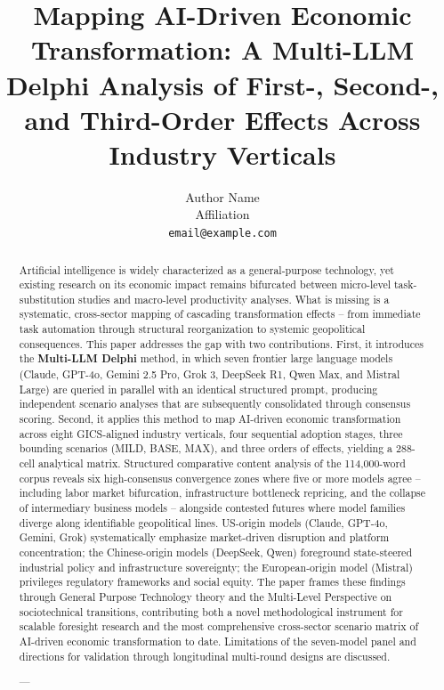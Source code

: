 \documentclass{article}
\title{Mapping AI-Driven Economic Transformation: A Multi-LLM Delphi Analysis of First-, Second-, and Third-Order Effects Across Industry Verticals}
\author{Author Name \\
Affiliation \\
\texttt{email@example.com}}
\begin{document}
\maketitle

\begin{abstract}
Artificial intelligence is widely characterized as a general-purpose technology, yet existing research on its economic impact remains bifurcated between micro-level task-substitution studies and macro-level productivity analyses. What is missing is a systematic, cross-sector mapping of cascading transformation effects -- from immediate task automation through structural reorganization to systemic geopolitical consequences. This paper addresses the gap with two contributions. First, it introduces the \textbf{Multi-LLM Delphi} method, in which seven frontier large language models (Claude, GPT-4o, Gemini 2.5 Pro, Grok 3, DeepSeek R1, Qwen Max, and Mistral Large) are queried in parallel with an identical structured prompt, producing independent scenario analyses that are subsequently consolidated through consensus scoring. Second, it applies this method to map AI-driven economic transformation across eight GICS-aligned industry verticals, four sequential adoption stages, three bounding scenarios (MILD, BASE, MAX), and three orders of effects, yielding a 288-cell analytical matrix. Structured comparative content analysis of the 114,000-word corpus reveals six high-consensus convergence zones where five or more models agree -- including labor market bifurcation, infrastructure bottleneck repricing, and the collapse of intermediary business models -- alongside contested futures where model families diverge along identifiable geopolitical lines. US-origin models (Claude, GPT-4o, Gemini, Grok) systematically emphasize market-driven disruption and platform concentration; the Chinese-origin models (DeepSeek, Qwen) foreground state-steered industrial policy and infrastructure sovereignty; the European-origin model (Mistral) privileges regulatory frameworks and social equity. The paper frames these findings through General Purpose Technology theory and the Multi-Level Perspective on sociotechnical transitions, contributing both a novel methodological instrument for scalable foresight research and the most comprehensive cross-sector scenario matrix of AI-driven economic transformation to date. Limitations of the seven-model panel and directions for validation through longitudinal multi-round designs are discussed.


---
\end{abstract}
\end{document}
